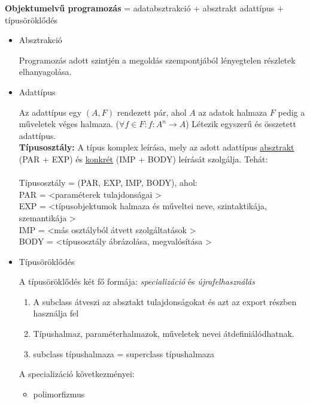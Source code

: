 \documentclass[margin=0px]{article}
\begin{document}
\textbf{Objektumelvű programozás} = adatabsztrakció + absztrakt adattípus + típusöröklődés
\begin{itemize}
    \item Absztrakció

          Programozás adott szintjén a megoldás szempontjából
          lényegtelen részletek elhanyagolása.

    \item Adattípus

          Az adattípus egy $ (A,F) $ rendezett pár, ahol $ A $ az adatok halmaza $ F $ pedig a műveletek véges halmaza. ($ \forall f \in F : f:A^n \rightarrow A $) Létezik egyszerű és összetett adattípus.\\
          \textbf{Típusosztály:} A típus komplex leírása, mely az adott adattípus \underline{absztrakt} (PAR + EXP) és \underline{konkrét} (IMP + BODY) leírását szolgálja. Tehát:\\\\
          Típusosztály = (PAR, EXP, IMP, BODY), ahol:\\
          PAR = \textless paraméterek tulajdonságai \textgreater\\
          EXP = \textless típusobjektumok halmaza és műveltei neve, szintaktikája, szemantikája \textgreater\\
          IMP = \textless más osztályból átvett szolgáltatások \textgreater\\
          BODY = \textless típusosztály ábrázolása, megvalósítása \textgreater\\

    \item Típusöröklődés

          A típusöröklődés két fő formája: \textit{specializáció} és  \textit{újrafelhasználás}
          \begin{enumerate}
              \item A subclass átveszi az absztakt tulajdonságokat és azt az export részben használja fel
              \item Típushalmaz, paraméterhalmazok, műveletek nevei átdefiniálódhatnak.
              \item subclass típushalmaza = superclass típushalmaza
          \end{enumerate}

          A specializáció következményei:
          \begin{itemize}
              \item polimorfizmus


\end{itemize}
\end{itemize}
\end{document}
